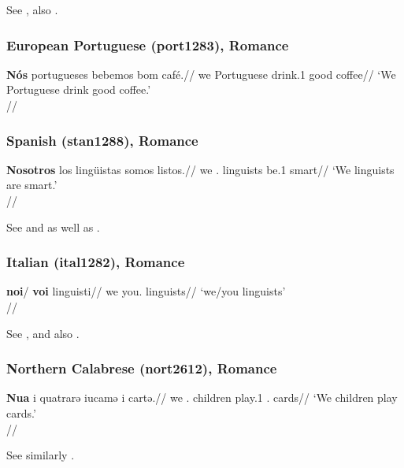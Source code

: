 \documentclass[A4paper]{article}
\begin{document}
See \citealp[560]{hoehn2015unagr}, also \citet[152, 301]{alvarezetal1986}.

\subsubsection{European Portuguese (port1283), Romance}

\ex 
\begingl
\gla \textbf{Nós} portugueses bebemos bom café.//
\glb we Portuguese drink.1\Pl{} good coffee//
\glft `We Portuguese drink good coffee.'\\\citep[555]{hoehn2015unagr}//
\endgl
\xe

\subsubsection{Spanish (stan1288), Romance}

\ex \begingl
\gla \textbf{Nosotros} los lingüistas somos listos.//
\glb we \Det.\Pl{} linguists be.1\Pl{} smart//
\glft `We linguists are smart.'\\\citep[210, (38a)]{choi2014phd}//
\endgl
\xe

See \citet[210f.]{choi2014phd} and \citet[560]{hoehn2015unagr} as well as \citet[145]{debruyne1995}.

\newpage

\subsubsection{Italian (ital1282), Romance}

\ex \begingl
\gla \textbf{noi}/ \textbf{voi} linguisti//
\glb we you.\Pl{} linguists//
\glft `we/you linguists'\\\citep[202, (21a)]{cardinaletti1994}//
\endgl
\xe

See \citet[202f.]{cardinaletti1994}, \citet[559]{hoehn2015unagr} and also \citet{hoehnetal2016CalabrUnagr,hoehnetalICGLcalabria}.

\subsubsection{Northern Calabrese (nort2612), Romance}

\ex \begingl
\gla \textbf{Nua} i quatrarə iucamə i cartə.//
\glb we \Det.\Pl{} children play.1\Pl{} \Det.\Pl{} cards//
\glft `We children play cards.'\\\citep[276, (23b)]{hoehnetalICGLcalabria}//
\endgl
\xe

See similarly \citet[142]{hoehnetal2016CalabrUnagr}.
\end{document}
